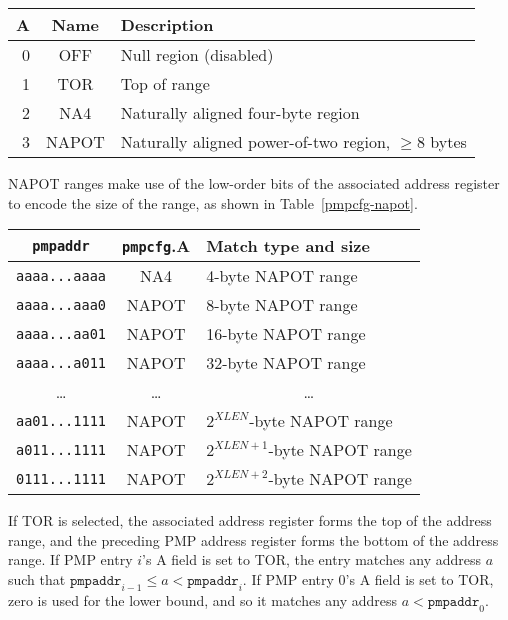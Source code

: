 \begin{table*}[ht!]
\begin{center}
\begin{tabular}{|r|c|l|}
\hline
A & Name & Description \\
\hline
0 & OFF   & Null region (disabled) \\
1 & TOR   & Top of range \\
2 & NA4   & Naturally aligned four-byte region \\
3 & NAPOT & Naturally aligned power-of-two region, $\ge$8 bytes \\
\hline
\end{tabular}
\end{center}
\caption{Encoding of A field in PMP configuration registers.}
\label{pmpcfg-a}
\end{table*}

NAPOT ranges make use of the low-order bits of the associated address register
to encode the size of the range, as shown in Table~\ref{pmpcfg-napot}.

\begin{table*}[ht!]
\begin{center}
  \begin{tabular}{|c|c|l|}
  \hline
  \texttt{pmpaddr}    & \texttt{pmpcfg}.A & Match type and size \\
  \hline
  \texttt{aaaa...aaaa} & NA4   & 4-byte NAPOT range \\
  \texttt{aaaa...aaa0} & NAPOT & 8-byte NAPOT range \\
  \texttt{aaaa...aa01} & NAPOT & 16-byte NAPOT range \\
  \texttt{aaaa...a011} & NAPOT & 32-byte NAPOT range \\
  \multicolumn{1}{|c|}{\ldots} &  \ldots  & \multicolumn{1}{|c|}{\ldots} \\
  \texttt{aa01...1111} & NAPOT & $2^{XLEN}$-byte NAPOT range \\
  \texttt{a011...1111} & NAPOT & $2^{XLEN+1}$-byte NAPOT range \\
  \texttt{0111...1111} & NAPOT & $2^{XLEN+2}$-byte NAPOT range \\
  \hline
  \end{tabular}
\end{center}
\caption{NAPOT range encoding in PMP address and configuration registers.}
\label{pmpcfg-napot}
\end{table*}

If TOR is selected, the associated address register forms the top of the
address range, and the preceding PMP address register forms the bottom of the
address range.  If PMP entry $i$'s A field is set to TOR, the entry matches
any address $a$ such that $\texttt{pmpaddr}_{i-1}\leq a < \texttt{pmpaddr}_i$.  If
PMP entry 0's A field is set to TOR, zero is used for the lower bound, and so
it matches any address $a < \texttt{pmpaddr}_0$.


